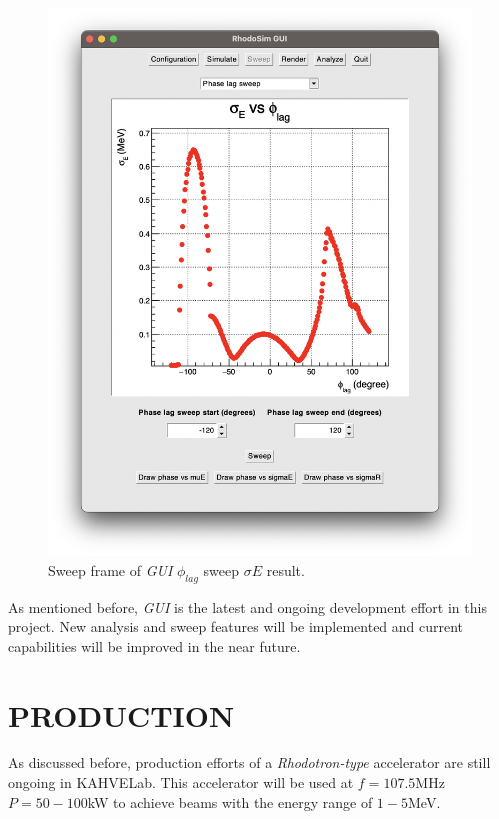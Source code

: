 \documentclass[a4paper,oneside,12pt]{report}
\numberwithin{equation}{chapter}
\begin{document}
\begin{figure}[h]
    \centering
    \includegraphics[width=0.85\linewidth]{./figures/rhodoSim/GUI_sweep_sE_3.png}
    \caption{Sweep frame of \textit{GUI} $\phi_{lag}$ sweep $\sigma E$ result.}
    \label{fig:gui_sweep_sE}
    \vspace{10pt}
\end{figure}

As mentioned before, \textit{GUI} is the latest and ongoing development effort in this project.
New analysis and sweep features will be implemented and current capabilities will be improved in the near future.



\newpage


\chapter{PRODUCTION}

As discussed before, production efforts of a \textit{Rhodotron-type} accelerator are still ongoing in KAHVELab.
This accelerator will be used at $f=107.5$MHz $P=50-100$kW to achieve beams with the energy range of $1-5$MeV.
\end{document}
